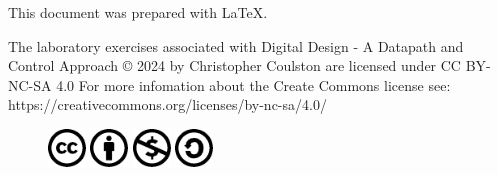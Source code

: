 This document was prepared with \LaTeX.
\vspace{2cm}

The laboratory exercises associated with  Digital Design - A Datapath and Control Approach © 2024 by
Christopher Coulston are licensed under CC BY-NC-SA 4.0
For more infomation about the Create Commons license see: https://creativecommons.org/licenses/by-nc-sa/4.0/

\begin{figure}[h]
    \includegraphics[width=1cm]{./Fig/cc-logo.pdf}
    \includegraphics[width=1cm]{./Fig/cc-by.pdf}
    \includegraphics[width=1cm]{./Fig/cc-nc.pdf}
    \includegraphics[width=1cm]{./Fig/cc-sa.pdf}
\end{figure}
